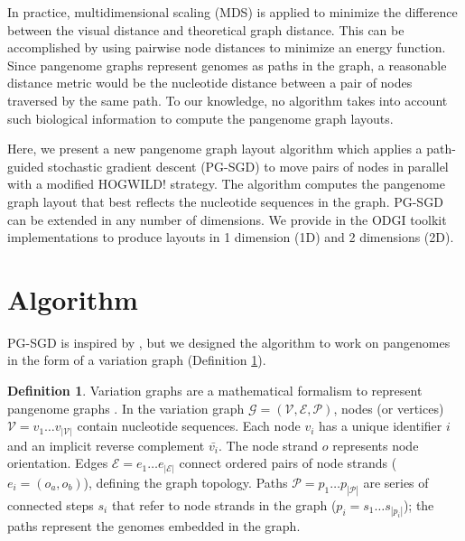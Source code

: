\documentclass{bioinfo}
\theoremstyle{definition}
\newtheorem{definition}{Definition}[section]
\newcommand{\red}[1]{{\textcolor{Red}{#1}}}
\newcommand{\FIXME}[1]{\red{[FIXME: #1]}}
\begin{document}
	In practice, multidimensional scaling (MDS) is applied to minimize the difference between the visual distance and theoretical graph distance.
	This can be accomplished by using pairwise node distances to minimize an energy function.
	Since pangenome graphs represent genomes as paths in the graph, a reasonable distance metric would be the nucleotide distance between a pair of nodes traversed by the same path.
	To our knowledge, no algorithm takes into account such biological information to compute the pangenome graph layouts.
	
	Here, we present a new pangenome graph layout algorithm which applies a path-guided stochastic gradient descent (PG-SGD) to move pairs of nodes in parallel with a modified HOGWILD! strategy.
	The algorithm computes the pangenome graph layout that best reflects the nucleotide sequences in the graph.
	PG-SGD can be extended in any number of dimensions. We provide in the ODGI toolkit \citep{Guarracino2022} implementations to produce layouts in 1 dimension (1D) and 2 dimensions (2D).

	\section{Algorithm}
	
	PG-SGD is inspired by \cite{Zheng2019}, but we designed the algorithm to work on pangenomes in the form of a variation graph (Definition \ref{def:vg}).
	
	\begin{definition}
		\label{def:vg}
		Variation graphs are a mathematical formalism to represent pangenome graphs \citep{Garrison_2019_thesis}.
		In the variation graph $\mathcal{G} = (\mathcal{V}, \mathcal{E}, \mathcal{P})$, nodes (or vertices) $\mathcal{V} = v_1\ldots v_{|\mathcal{V}|}$ contain nucleotide sequences.
		Each node $v_i$ has a unique identifier $i$ and an implicit reverse complement $\bar{v_i}$.
		The node strand $o$ represents node orientation.
		Edges $\mathcal{E} = e_1\ldots e_{|\mathcal{E}|}$ connect ordered pairs of node strands ($e_i = ( o_a, o_b )$), defining the graph topology.
		Paths $\mathcal{P} = p_1\ldots p_{|\mathcal{P}|}$ are series of connected steps $s_i$ that refer to node strands in the graph ($p_i = s_1 \ldots s_{|p_i|}$); the paths represent the genomes embedded in the graph.
	\end{definition}
\end{document}
